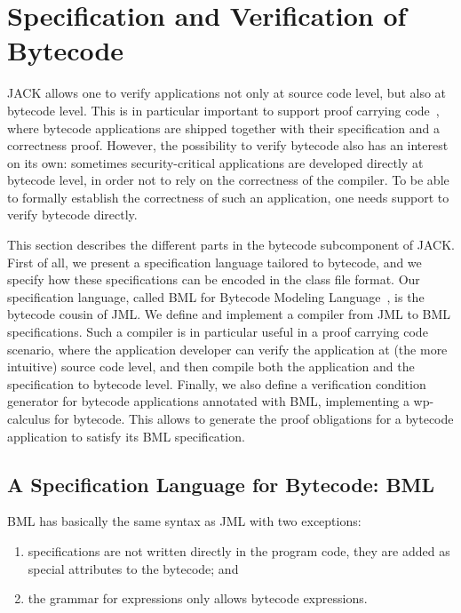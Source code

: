 
\section{Specification and Verification of Bytecode}\label{SecBytecode}

JACK allows one to verify applications not only at source code level,
but also at bytecode level. This is in particular important to support
proof carrying code~\cite{Necula97}, where bytecode applications are
shipped together with their specification and a correctness
proof. However, the possibility to verify bytecode also has an
interest on its own: sometimes security-critical applications are
developed directly at bytecode level, in order not to rely on the
correctness of the compiler. To be able to formally establish the
correctness of such an application, one needs support to verify
bytecode directly.

This section describes the different parts in the bytecode
subcomponent of JACK. First of all, we present a specification
language tailored to bytecode, and we specify how these specifications
can be encoded in the class file format. Our specification language,
called BML for Bytecode Modeling Language~\cite{BurdyHP07}, is the
bytecode cousin of JML. We define and implement a compiler from JML to
BML specifications. Such a compiler is in particular useful in a proof
carrying code scenario, where the application developer can verify the
application at (the more intuitive) source code level, and then
compile both the application and the specification to bytecode
level. Finally, we also define a verification condition generator for
bytecode applications annotated with BML, implementing a wp-calculus
for bytecode. This allows to generate the proof obligations for a
bytecode application to satisfy its BML specification.

\subsection{A Specification Language for Bytecode: BML}

BML has basically the same syntax as JML with two exceptions:
\begin{enumerate}
\item specifications are not written directly in the program code,
they are added as special attributes to the bytecode; and
\item the grammar for expressions only allows bytecode expressions.
\end{enumerate}


